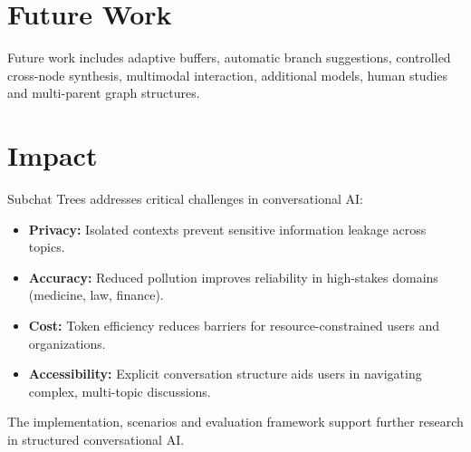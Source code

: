 






\section{Future Work}
Future work includes adaptive buffers, automatic branch suggestions, controlled cross-node synthesis, multimodal interaction, additional models, human studies and multi-parent graph structures.

\section{Impact}\label{subsec:impact}
Subchat Trees addresses critical challenges in conversational AI:
\begin{itemize}
    \item \textbf{Privacy:} Isolated contexts prevent sensitive information leakage across topics.
    \item \textbf{Accuracy:} Reduced pollution improves reliability in high-stakes domains (medicine, law, finance).
    \item \textbf{Cost:} Token efficiency reduces barriers for resource-constrained users and organizations.
    \item \textbf{Accessibility:} Explicit conversation structure aids users in navigating complex, multi-topic discussions.
\end{itemize}

The implementation, scenarios and evaluation framework support further research in structured conversational AI.
